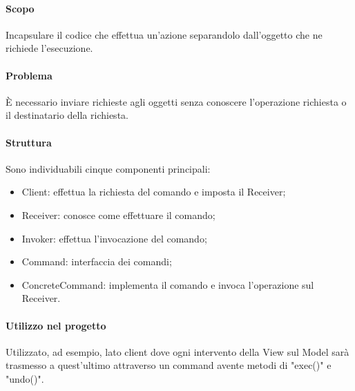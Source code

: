 \documentclass[../PianoDiQualifica.tex]{subfiles}
\begin{document}
				\paragraph{Scopo\\}
					Incapsulare il codice che effettua un'azione separandolo dall'oggetto che ne
					richiede l'esecuzione.
				\paragraph{Problema\\}
					È necessario inviare richieste agli oggetti senza conoscere l'operazione richiesta
					o il destinatario della richiesta.
				\paragraph{Struttura\\}
					Sono individuabili cinque componenti principali:
					\begin{itemize}
						\item Client: effettua la richiesta del comando e imposta il
						Receiver;
						\item Receiver: conosce come effettuare il comando; 
						\item Invoker: effettua l'invocazione del comando;
						\item Command: interfaccia dei comandi;
						\item ConcreteCommand: implementa il comando e invoca l'operazione sul Receiver.
					\end{itemize}
				\paragraph{Utilizzo nel progetto\\}
					Utilizzato, ad esempio, lato client dove ogni intervento della View sul Model sarà
					trasmesso a quest'ultimo attraverso un command avente metodi di "exec()" e "undo()".	
\end{document}

